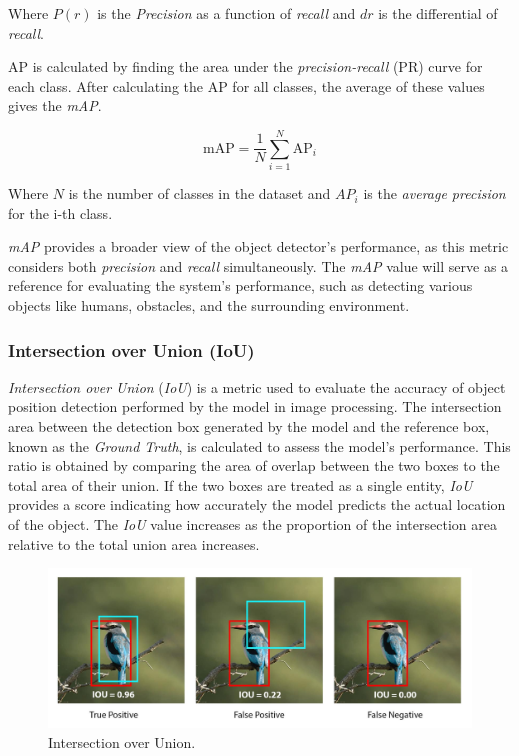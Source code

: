 Where \(P(r)\) is the \emph{Precision} as a function of \emph{recall} and \(dr\) is the differential of \emph{recall}.

AP is calculated by finding the area under the \emph{precision-recall} (PR) curve for each class. After calculating the AP for all classes, the average of these values gives the \emph{mAP}.

\begin{equation}
  \mathrm{mAP} = \frac{1}{N} \sum_{i=1}^{N} \mathrm{AP}_i
\end{equation}

Where \(N\) is the number of classes in the dataset and \(AP_i\) is the \emph{average precision} for the i-th class.

\emph{mAP} provides a broader view of the object detector's performance, as this metric considers both \emph{precision} and \emph{recall} simultaneously. The \emph{mAP} value will serve as a reference for evaluating the system's performance, such as detecting various objects like humans, obstacles, and the surrounding environment.

\vspace{5pt}
\subsubsection{Intersection over Union (IoU)}
\label{subsubsec:IoU}

\emph{Intersection over Union} (\emph{IoU}) is a metric used to evaluate the accuracy of object position detection performed by the model in image processing. The intersection area between the detection box generated by the model and the reference box, known as the \emph{Ground Truth}, is calculated to assess the model's performance. This ratio is obtained by comparing the area of overlap between the two boxes to the total area of their union. If the two boxes are treated as a single entity, \emph{IoU} provides a score indicating how accurately the model predicts the actual location of the object. The \emph{IoU} value increases as the proportion of the intersection area relative to the total union area increases.

\begin{figure}[H]
  \centering
  \includegraphics[scale=0.15]{gambar/IoU bbox.jpg}
  \caption{Intersection over Union.}
  \label{fig:IoU_bbox}
\end{figure}

